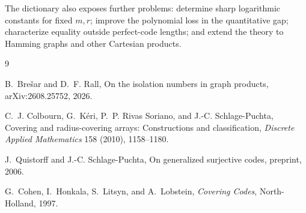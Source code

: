 \documentclass[11pt]{article}
\theoremstyle{definition}
\theoremstyle{remark}
\begin{document}
The dictionary also exposes further problems: determine sharp logarithmic
constants for fixed $m,r$; improve the polynomial loss in the quantitative gap;
characterize equality outside perfect-code lengths; and extend the theory to
Hamming graphs and other Cartesian products.

\begin{thebibliography}{9}

B.~Bre\v{s}ar and D.~F. Rall,
\newblock On the isolation numbers in graph products,
\newblock arXiv:2608.25752, 2026.

C.~J. Colbourn, G.~K\'eri, P.~P. Rivas Soriano, and J.-C. Schlage-Puchta,
\newblock Covering and radius-covering arrays: Constructions and classification,
\newblock \emph{Discrete Applied Mathematics} 158 (2010), 1158--1180.

J.~Quistorff and J.-C. Schlage-Puchta,
\newblock On generalized surjective codes,
\newblock preprint, 2006.

G.~Cohen, I.~Honkala, S.~Litsyn, and A.~Lobstein,
\newblock \emph{Covering Codes},
\newblock North-Holland, 1997.

\end{thebibliography}
\end{document}
